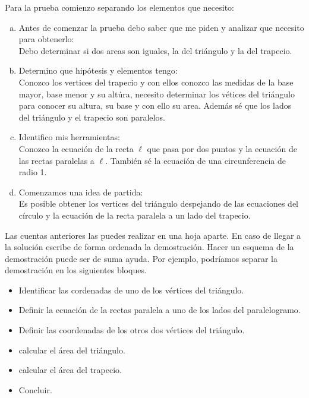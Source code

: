 Para la prueba comienzo separando los elementos que necesito:

\begin{enumerate}[a)]
  \item Antes de comenzar la prueba debo saber que me piden
    y analizar que necesito para obtenerlo:\\
    Debo determinar si dos areas son iguales,
    la del triángulo y la del trapecio.

  \item Determino que hipótesis y elementos tengo:\\
    Conozco los vertices del trapecio
    y con ellos conozco las medidas
    de la base mayor, base menor y su altúra,
    necesito determinar los vétices del triángulo para conocer su altura,
    su base y con ello su area.
    Además sé que los lados del triángulo y el trapecio son paralelos.

  \item Identifico mis herramientas:\\
    Conozco la ecuación de la recta $\ell$ que pasa por dos puntos
    y la ecuación de las rectas paralelas a $\ell.$
    También sé la ecuación de una circunferencia de radio 1.

  \item Comenzamos una idea de partida:\\
    Es posible obtener los vertices del triángulo
    despejando de las ecuaciones del círculo
    y la ecuación de la recta paralela a un lado del trapecio.

\end{enumerate}

Las cuentas anteriores las puedes realizar en una hoja aparte.
En caso de llegar a la solución escribe de forma ordenada la demostración.
 Hacer un esquema de la demostración puede ser de suma ayuda. Por ejemplo, podríamos separar la demostración en los siguientes bloques.
\begin{itemize}
    \item Identificar las cordenadas de uno de los vértices del triángulo.
    \item Definir la ecuación de la rectas paralela a uno de los lados del paralelogramo.
    \item Definir las coordenadas de los otros dos vértices del triángulo.
    \item calcular el área del triángulo.
    \item calcular el área del trapecio.
    \item Concluir.
\end{itemize}


